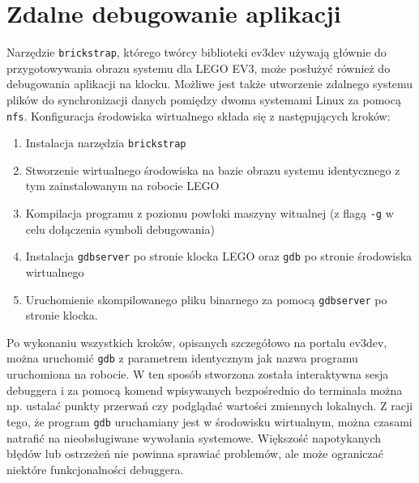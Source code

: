 \section{Zdalne debugowanie aplikacji}
\label{app:gdb}

Narzędzie {\tt brickstrap}, którego twórcy biblioteki ev3dev używają głównie do przygotowywania obrazu systemu dla LEGO EV3, może posłużyć również do debugowania aplikacji na klocku. Możliwe jest także utworzenie zdalnego systemu plików do synchronizacji danych pomiędzy dwoma systemami Linux za pomocą {\tt nfs}. Konfiguracja środowiska wirtualnego\cite{gdb} składa się z następujących kroków:

\begin{enumerate}
    \item Instalacja narzędzia {\tt brickstrap}
    \item Stworzenie wirtualnego środowiska na bazie obrazu systemu identycznego z tym zainstalowanym na robocie LEGO
    \item Kompilacja programu z poziomu powłoki maszyny witualnej (z flagą {\tt -g} w\,celu dołączenia symboli debugowania)
    \item Instalacja {\tt gdbserver} po stronie klocka LEGO oraz {\tt gdb} po stronie środowiska wirtualnego
    \item Uruchomienie skompilowanego pliku binarnego za pomocą {\tt gdbserver} po stronie klocka.
\end{enumerate}

Po wykonaniu wszystkich kroków, opisanych szczegółowo na portalu ev3dev\cite{gdb}, można uruchomić {\tt gdb} z parametrem identycznym jak nazwa programu uruchomiona na robocie. W ten sposób stworzona została interaktywna sesja debuggera i za pomocą komend wpisywanych bezpośrednio do terminala można np. ustalać punkty przerwań czy podglądać wartości zmiennych lokalnych. Z racji tego, że program {\tt gdb} uruchamiany jest w środowisku wirtualnym, można czasami natrafić na nieobsługiwane wywołania systemowe. Większość napotykanych błędów lub ostrzeżeń nie powinna sprawiać problemów, ale może ograniczać niektóre funkcjonalności debuggera.
